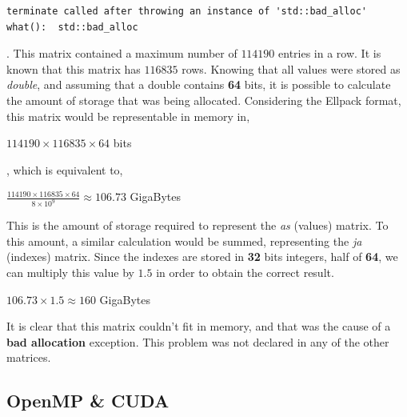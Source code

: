 \documentclass[12pt]{article}
\begin{document}
\begin{lstlisting}[style=tests]
terminate called after throwing an instance of 'std::bad_alloc'
what():  std::bad_alloc
\end{lstlisting}

. This matrix contained a maximum number of $114190$ entries in a row. It is known that this matrix has $116835$ rows. Knowing that all values were stored as \textit{double}, and assuming that a double contains \textbf{64} bits, it is possible to calculate the amount of storage that was being allocated. Considering the Ellpack format, this matrix would be representable in memory in,

\begin{center}
	$ 114190 \times 116835 \times 64 $ bits 
\end{center}

, which is equivalent to,

\begin{center}
	\Large	
	$ \frac{114190 \times 116835 \times 64}{8 \times 10^9} \approx 106.73$ 
	\normalsize
	GigaBytes 
\end{center}

\par This is the amount of storage required to represent the \textit{as} (values) matrix. To this amount, a similar calculation would be summed, representing the \textit{ja} (indexes) matrix. Since the indexes are stored in \textbf{32} bits integers, half of \textbf{64}, we can multiply this value by $1.5$ in order to obtain the correct result.
\begin{center}
	\Large	
	$ 106.73 \times 1.5 \approx 160 $ 
	\normalsize
	GigaBytes 
\end{center}
\par It is clear that this matrix couldn't fit in memory, and that was the cause of a \textbf{bad allocation} exception. This problem was not declared in any of the other matrices.

\subsection*{OpenMP \& CUDA}
\end{document}
